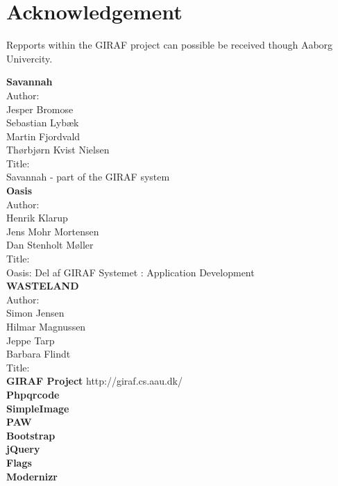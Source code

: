 \chapter{Acknowledgement}
\label{acknowledgement}
Repports within the GIRAF project can possible be received though Aaborg Univercity.   

\textbf{Savannah}\\
Author:\\ 
Jesper Bromose\\
Sebastian Lybæk\\
Martin Fjordvald\\
Thørbjørn Kvist Nielsen\\

Title:\\
Savannah - part of the GIRAF system\\

\textbf{Oasis}\\
Author:\\
Henrik Klarup\\
Jens Mohr Mortensen\\
Dan Stenholt Møller\\

Title:\\
Oasis: Del af GIRAF Systemet : Application Development\\


\textbf{WASTELAND}\\
Author:\\
Simon Jensen\\
Hilmar Magnussen\\
Jeppe Tarp\\
Barbara Flindt\\
Title:\\

\textbf{GIRAF Project}
http://giraf.cs.aau.dk/\\

\textbf{Phpqrcode}\\

\textbf{SimpleImage}\\

\textbf{PAW}\\

\textbf{Bootstrap}\\

\textbf{jQuery}\\

\textbf{Flags}\\

\textbf{Modernizr}\\
